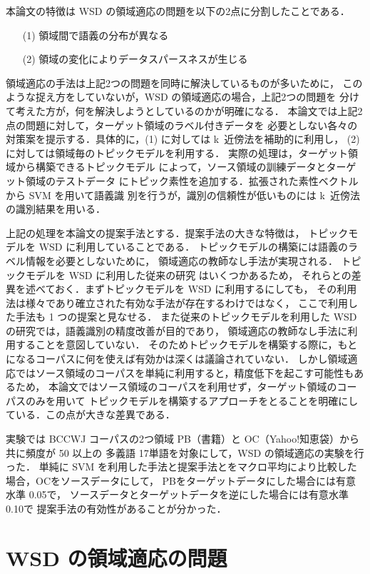 \documentclass[japanese]{jnlp_1.4}
\begin{document}
本論文の特徴は WSD の領域適応の問題を以下の2点に分割したことである．
\begin{enumerate}
      \item[(1)] 領域間で語義の分布が異なる
      \item[(2)] 領域の変化によりデータスパースネスが生じる
\end{enumerate}
領域適応の手法は上記2つの問題を同時に解決しているものが多いために，
このような捉え方をしていないが，WSD の領域適応の場合，上記2つの問題を
分けて考えた方が，何を解決しようとしているのかが明確になる．
本論文では上記2点の問題に対して，ターゲット領域のラベル付きデータを
必要としない各々の対策案を提示する．具体的に，(1) に対しては k~近傍法を補助的に利用し，
(2) に対しては領域毎のトピックモデル\cite{blei}を利用する．
実際の処理は，ターゲット領域から構築できるトピックモデル
によって，ソース領域の訓練データとターゲット領域のテストデータ
にトピック素性を追加する．拡張された素性ベクトルから SVM を用いて語義識
別を行うが，識別の信頼性が低いものには k~近傍法の識別結果を用いる．

上記の処理を本論文の提案手法とする．提案手法の大きな特徴は，
トピックモデルを WSD に利用していることである．
トピックモデルの構築には語義のラベル情報を必要としないために，
領域適応の教師なし手法が実現される．
トピックモデルを WSD に利用した従来の研究\cite{li,boyd1,boyd2}
はいくつかあるため，
それらとの差異を述べておく．まずトピックモデルを WSD に利用するにしても，
その利用法は様々であり確立された有効な手法が存在するわけではなく，
ここで利用した手法も 1 つの提案と見なせる．
また従来のトピックモデルを利用した WSD の研究では，語義識別の精度改善が目的であり，
領域適応の教師なし手法に利用することを意図していない．
そのためトピックモデルを構築する際に，もとになるコーパスに何を使えば有効かは深くは議論されていない．
しかし領域適応ではソース領域のコーパスを単純に利用すると，精度低下を起こす可能性もあるため，
本論文ではソース領域のコーパスを利用せず，ターゲット領域のコーパスのみを用いて
トピックモデルを構築するアプローチをとることを明確にしている．この点が大きな差異である．

実験では BCCWJ コーパス\cite{bccwj}の2つ領域 PB（書籍）と OC（Yahoo!知恵袋）から共に頻度が 50 以上の
多義語 17単語を対象にして，WSD の領域適応の実験を行った．
単純に SVM を利用した手法と提案手法とをマクロ平均により比較した場合，OCをソースデータにして，
PBをターゲットデータにした場合には有意水準 0.05で，
ソースデータとターゲットデータを逆にした場合には有意水準 0.10で
提案手法の有効性があることが分かった．



\section{WSD の領域適応の問題}
\end{document}
